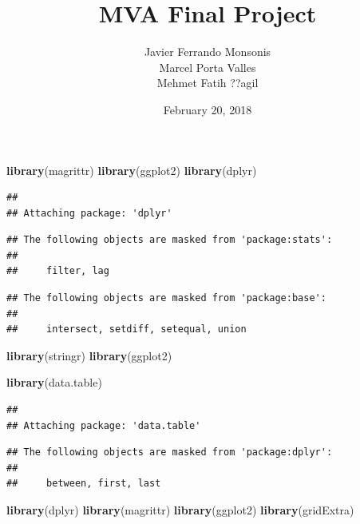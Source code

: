 \documentclass[]{article}
\title{MVA Final Project}
\author{Javier Ferrando Monsonis \\ Marcel Porta Valles \\ Mehmet Fatih ??agil}
\date{February 20, 2018}
\newenvironment{Shaded}{\begin{snugshade}}{\end{snugshade}}
\newcommand{\KeywordTok}[1]{\textcolor[rgb]{0.13,0.29,0.53}{\textbf{#1}}}
\newcommand{\NormalTok}[1]{#1}
\begin{document}
\maketitle

\begin{Shaded}
\begin{Highlighting}[]
\KeywordTok{library}\NormalTok{(magrittr)}
\KeywordTok{library}\NormalTok{(ggplot2)}
\KeywordTok{library}\NormalTok{(dplyr)}
\end{Highlighting}
\end{Shaded}

\begin{verbatim}
## 
## Attaching package: 'dplyr'
\end{verbatim}

\begin{verbatim}
## The following objects are masked from 'package:stats':
## 
##     filter, lag
\end{verbatim}

\begin{verbatim}
## The following objects are masked from 'package:base':
## 
##     intersect, setdiff, setequal, union
\end{verbatim}

\begin{Shaded}
\begin{Highlighting}[]
\KeywordTok{library}\NormalTok{(stringr)}
\KeywordTok{library}\NormalTok{(ggplot2)}

\KeywordTok{library}\NormalTok{(data.table)}
\end{Highlighting}
\end{Shaded}

\begin{verbatim}
## 
## Attaching package: 'data.table'
\end{verbatim}

\begin{verbatim}
## The following objects are masked from 'package:dplyr':
## 
##     between, first, last
\end{verbatim}

\begin{Shaded}
\begin{Highlighting}[]
\KeywordTok{library}\NormalTok{(dplyr)}
\KeywordTok{library}\NormalTok{(magrittr)}
\KeywordTok{library}\NormalTok{(ggplot2)}
\KeywordTok{library}\NormalTok{(gridExtra)}
\end{Highlighting}
\end{Shaded}
\end{document}
